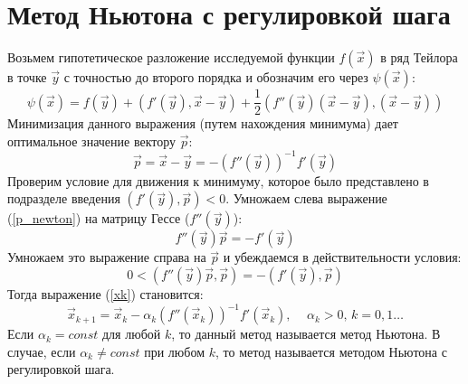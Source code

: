 \section{Метод Ньютона с регулировкой шага} \label{NewtMeth}
Возьмем гипотетическое разложение исследуемой функции $f(\vec x)$ в ряд Тейлора в точке $\vec y$ с точностью до второго порядка и обозначим его через $\psi(\vec x)$:
\begin{equation}
    \psi(\vec x) = f(\vec y) + \left(f'(\vec y), \vec x - \vec y\right) + \frac12\left(f''(\vec y)(\vec x - \vec y), (\vec x - \vec y)\right)
\end{equation}
Минимизация данного выражения (путем нахождения минимума) дает оптимальное значение вектору $\vec p$:
\begin{equation}
    \vec p= \vec x - \vec y = - \left(f''(\vec y)\right)^{-1}f'(\vec y)
    \label{p_newton}
\end{equation}
Проверим условие для движения к минимуму, которое было представлено в подразделе введения $\left(f'(\vec y), \vec p\right) < 0$. Умножаем слева выражение (\ref{p_newton}) на матрицу Гессе ($f''(\vec y)$):
\begin{equation}
    f''(\vec y)\vec p = - f'(\vec y)
\end{equation}
Умножаем это выражение справа на $\vec p$ и убеждаемся в действительности условия:
\begin{equation}
    0<\left(f''(\vec y)\vec p, \vec p\right) = - \left(f'(\vec y), \vec p\right)
\end{equation}
Тогда выражение (\ref{xk}) становится:
\begin{equation}
    \vec x_{k+1} = \vec x_k - \alpha_k (f''(\vec x_k))^{-1} f'(\vec x_k) \textbf{, } \quad \alpha_k > 0 \text{, } k = 0, 1 \ldots
\end{equation}
Если $\alpha_k = const$ для любой $k$, то данный метод называется метод Ньютона. В случае, если $\alpha_k \neq const$ при любом $k$, то метод называется методом Ньютона с регулировкой шага.